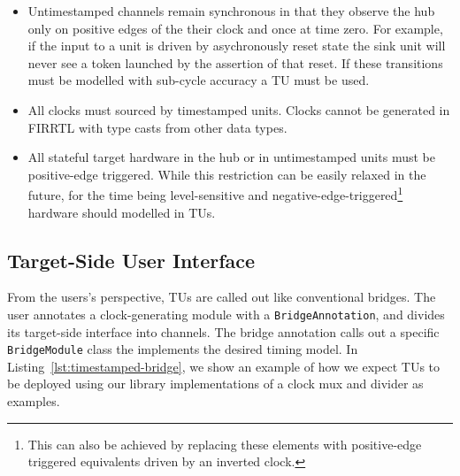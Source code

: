 \begin{itemize}

\item Untimestamped channels remain synchronous in that they observe the hub only on
    positive edges of the their clock and once at time zero. For example,
    if the input to a unit is driven by asychronously reset state the sink
    unit will never see a token launched by the assertion of that reset. If these transitions must be modelled
    with sub-cycle accuracy a TU must be used.

\item All clocks must sourced by timestamped units. Clocks cannot be generated in
    FIRRTL with type casts from other data types.

\item All stateful target hardware in the hub or in untimestamped units must be
    positive-edge triggered. While this restriction can be easily relaxed in
    the future, for the time being level-sensitive and
    negative-edge-triggered\footnote{This can also be achieved by replacing
    these elements with positive-edge triggered equivalents driven by an inverted
    clock.} hardware should modelled in TUs.

\end{itemize}

\subsection{Target-Side User Interface}

From the users's perspective, TUs are called out like conventional bridges.
The user annotates a clock-generating module with a \texttt{BridgeAnnotation},
and divides its target-side interface into channels. The bridge annotation
calls out a specific \texttt{BridgeModule} class the implements the desired
timing model. In Listing~\ref{lst:timestamped-bridge}, we show an example of
how we expect TUs to be deployed using our library implementations of a clock
mux and divider as examples.

